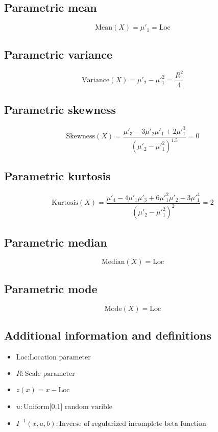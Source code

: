 \documentclass{article}
\begin{document}
\subsection{Parametric mean}
\begin{equation*} \mathrm{Mean}(X)=\mu'_{1}=\text{Loc} \end{equation*}
\subsection{Parametric variance}
\begin{equation*} \mathrm{Variance}(X)=\mu'_{2}-\mu'^{2}_{1}=\frac{R^2}{4} \end{equation*}
\subsection{Parametric skewness}
\begin{equation*} \mathrm{Skewness}(X)=\frac{\mu'_{3}-3\mu'_{2}\mu'_{1}+2\mu'^{3}_{1}}{(\mu'_{2}-\mu'^{2}_{1})^{1.5}}=0 \end{equation*}
\subsection{Parametric kurtosis}
\begin{equation*} \mathrm{Kurtosis}(X)=\frac{\mu'_{4}-4\mu'_{1}\mu'_{3}+6\mu'^{2}_{1}\mu'_{2}-3\mu'^{4}_{1}}{(\mu'_{2}-\mu'^{2}_{1})^{2}}=2 \end{equation*}
\subsection{Parametric median}
\begin{equation*} \mathrm{Median}(X)=\text{Loc} \end{equation*}
\subsection{Parametric mode}
\begin{equation*} \mathrm{Mode}(X)=\text{Loc} \end{equation*}
\subsection{Additional information and definitions}
\begin{itemize}
    \item $ \text{Loc}:\text{Location parameter} $
    \item $ R:\text{Scale parameter} $
    \item $ z\left(x\right)= x-\text{Loc} $
    \item $ u:\text{Uniform[0,1] random varible} $
    \item $ I^{-1}\left(x,a,b\right):\text{Inverse of regularized incomplete beta function} $
\end{itemize}
\end{document}
